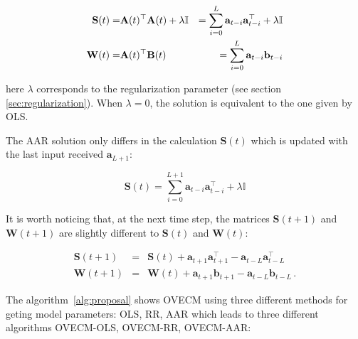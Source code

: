 \begin{eqnarray*}
\mathbf{S}(t) =&{\bf A}(t)^\top{\bf A}(t)+ \lambda \mathbb{I} &=
\sum_{i=0}^L \mathbf{a}_{t-i}\mathbf{a}_{t-i}^\top + \lambda \mathbb{I}
\label{eq:S} \\
\mathbf{W}(t) =& {\bf A}(t)^\top{\bf B}(t) &= 
\sum_{i=0}^L \mathbf{a}_{t-i}\mathbf{b}_{t-i} 
\label{eq:W}
\end{eqnarray*}

\noindent here $\lambda$ corresponds to the regularization parameter (see section
\ref{sec:regularization}). When $\lambda=0$, the solution is equivalent to the
one given by OLS.

The AAR solution only differs in the calculation $\mathbf{S}(t)$ which is
updated with the last input received $\mathbf{a}_{L+1}$:

\begin{equation}
\mathbf{S}(t) =
\sum_{i=0}^{L+1} \mathbf{a}_{t-i}\mathbf{a}_{t-i}^\top + \lambda \mathbb{I}
\label{eq:SAAR}
\end{equation}

It is worth noticing that, at the next time step, the matrices $\mathbf{S}(t+1)$
and $\mathbf{W}(t+1)$ are slightly different to $\mathbf{S}(t)$ and
$\mathbf{W}(t)$:

\begin{eqnarray*}
\mathbf{S}(t+1)&=&
\mathbf{S}(t) +
\mathbf{a}_{t+1}
\mathbf{a}_{t+1}^\top -
\mathbf{a}_{t-L} \mathbf{a}_{t-L}^\top \\
\mathbf{W}(t+1)&=&
\mathbf{W}(t) +
\mathbf{a}_{t+1}
\mathbf{b}_{t+1} -
\mathbf{a}_{t-L} \mathbf{b}_{t-L} \, .
\end{eqnarray*}


The algorithm~\ref{alg:proposal} shows OVECM using three different
methods for geting model parameters: OLS, RR, AAR which leads to three different
algorithms OVECM-OLS, OVECM-RR, OVECM-AAR:


